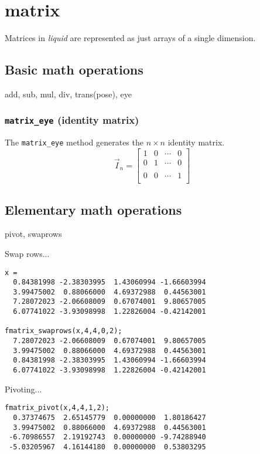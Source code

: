 % 
%
\section{matrix}
\label{module:matrix}
Matrices in {\it liquid} are represented as just arrays of a single dimension.

\subsection{Basic math operations}
\label{module:matrix:math}
add, sub, mul, div, trans(pose), eye

\subsubsection{{\tt matrix\_eye} (identity matrix)}
The {\tt matrix\_eye} method generates the $n \times n$ identity matrix.
\[
    \vec{I}_n = 
    \begin{bmatrix}
        1 & 0 & \cdots & 0 \\
        0 & 1 & \cdots & 0 \\
        \\
        0 & 0 & \cdots & 1 \\
    \end{bmatrix}
\]

\subsection{Elementary math operations}
\label{module:matrix:elementary}
pivot, swaprows

Swap rows...
\begin{verbatim}
x = 
  0.84381998 -2.38303995  1.43060994 -1.66603994
  3.99475002  0.88066000  4.69372988  0.44563001
  7.28072023 -2.06608009  0.67074001  9.80657005
  6.07741022 -3.93098998  1.22826004 -0.42142001

fmatrix_swaprows(x,4,4,0,2);
  7.28072023 -2.06608009  0.67074001  9.80657005
  3.99475002  0.88066000  4.69372988  0.44563001
  0.84381998 -2.38303995  1.43060994 -1.66603994
  6.07741022 -3.93098998  1.22826004 -0.42142001
\end{verbatim}

Pivoting...
\begin{verbatim}
fmatrix_pivot(x,4,4,1,2);
  0.37374675  2.65145779  0.00000000  1.80186427
  3.99475002  0.88066000  4.69372988  0.44563001
 -6.70986557  2.19192743  0.00000000 -9.74288940
 -5.03205967  4.16144180  0.00000000  0.53803295
\end{verbatim}

